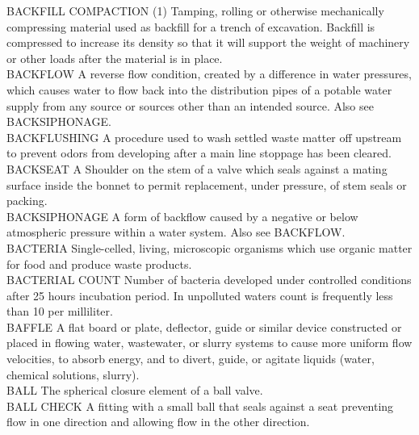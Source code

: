 \documentclass{article}
\begin{document}
BACKFILL COMPACTION
(1) Tamping, rolling or otherwise mechanically compressing material used as backfill for a trench of excavation. Backfill is compressed to increase its density so that it will support the weight of machinery or other loads after the material is in place. 
\vspace{0.3cm}\\
BACKFLOW
A reverse flow condition, created by a difference in water pressures, which causes water to flow back into the distribution pipes of a potable water supply from any source or sources other than an intended source. Also see BACKSIPHONAGE.
\vspace{0.3cm}\\
BACKFLUSHING
A procedure used to wash settled waste matter off upstream to prevent odors from developing after a main line stoppage has been cleared. 
\vspace{0.3cm}\\
BACKSEAT
A Shoulder on the stem of a valve which seals against a mating surface inside the bonnet to permit replacement, under pressure, of stem seals or packing.
\vspace{0.3cm}\\
BACKSIPHONAGE
A form of backflow caused by a negative or below atmospheric pressure within a water system. Also see BACKFLOW.
\vspace{0.3cm}\\
BACTERIA
Single-celled, living, microscopic organisms which use organic matter for food and produce waste products.
\vspace{0.3cm}\\
BACTERIAL COUNT
Number of bacteria developed under controlled conditions after 25 hours incubation period. In unpolluted waters count is frequently less than 10 per milliliter.
\vspace{0.3cm}\\
BAFFLE
A flat board or plate, deflector, guide or similar device constructed or placed in flowing water, wastewater, or slurry systems to cause more uniform flow velocities, to absorb energy, and to divert, guide, or agitate liquids (water, chemical solutions, slurry).
\vspace{0.3cm}\\
BALL
The spherical closure element of a ball valve.
\vspace{0.3cm}\\
BALL CHECK
A fitting with a small ball that seals against a seat preventing flow in one direction and allowing flow in the other direction.
\vspace{0.3cm}\\
\end{document}
